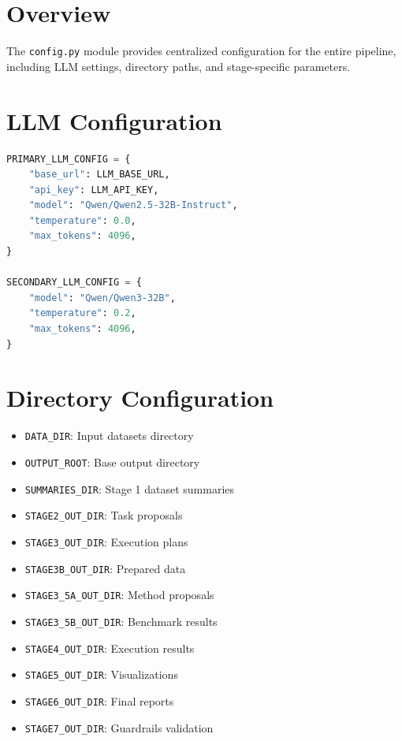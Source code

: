 \documentclass[12pt,a4paper]{report}
\begin{document}
\section{Overview}
The \texttt{config.py} module provides centralized configuration for the entire pipeline, including LLM settings, directory paths, and stage-specific parameters.

\section{LLM Configuration}
\begin{lstlisting}[language=Python]
PRIMARY_LLM_CONFIG = {
    "base_url": LLM_BASE_URL,
    "api_key": LLM_API_KEY,
    "model": "Qwen/Qwen2.5-32B-Instruct",
    "temperature": 0.0,
    "max_tokens": 4096,
}

SECONDARY_LLM_CONFIG = {
    "model": "Qwen/Qwen3-32B",
    "temperature": 0.2,
    "max_tokens": 4096,
}
\end{lstlisting}

\section{Directory Configuration}
\begin{itemize}
    \item \texttt{DATA\_DIR}: Input datasets directory
    \item \texttt{OUTPUT\_ROOT}: Base output directory
    \item \texttt{SUMMARIES\_DIR}: Stage 1 dataset summaries
    \item \texttt{STAGE2\_OUT\_DIR}: Task proposals
    \item \texttt{STAGE3\_OUT\_DIR}: Execution plans
    \item \texttt{STAGE3B\_OUT\_DIR}: Prepared data
    \item \texttt{STAGE3\_5A\_OUT\_DIR}: Method proposals
    \item \texttt{STAGE3\_5B\_OUT\_DIR}: Benchmark results
    \item \texttt{STAGE4\_OUT\_DIR}: Execution results
    \item \texttt{STAGE5\_OUT\_DIR}: Visualizations
    \item \texttt{STAGE6\_OUT\_DIR}: Final reports
    \item \texttt{STAGE7\_OUT\_DIR}: Guardrails validation
\end{itemize}
\end{document}
